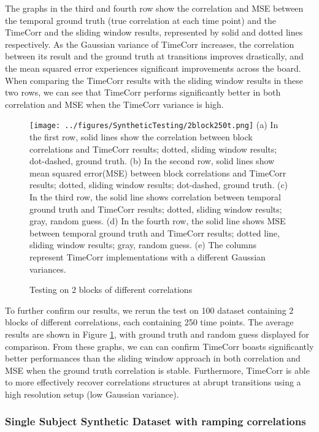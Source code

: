 \documentclass[11pt]{article}
\begin{document}
The graphs in the third and fourth row show the correlation and MSE between the temporal ground truth (true correlation at each time point) and the TimeCorr and the sliding window results, represented by solid and dotted lines respectively. As the Gaussian variance of TimeCorr increases, the correlation between its result and the ground truth at transitions improves drastically, and the mean squared error experiences significant improvements across the board. When comparing the TimeCorr results with the sliding window results in these two rows, we can see that TimeCorr performs significantly better in both correlation and MSE when the TimeCorr variance is high.

\begin{figure}[!htb]
\caption{Testing on 2 blocks of different correlations}
\texttt{[image: ../figures/SyntheticTesting/2block250t.png]}
\label{fig:2block250t}
(a) In the first row, solid lines show the correlation between block correlations and TimeCorr results; dotted, sliding window results; dot-dashed, ground truth. (b) In the second row, solid lines show mean squared error(MSE) between block correlations and TimeCorr results; dotted, sliding window results; dot-dashed, ground truth. (c) In the third row, the solid line shows correlation between temporal ground truth and TimeCorr results; dotted, sliding window results; gray, random guess. (d) In the fourth row, the solid line shows MSE between temporal ground truth and TimeCorr results; dotted line, sliding window results; gray, random guess. (e) The columns represent TimeCorr implementations with a different Gaussian variances.
\end{figure}

To further confirm our results, we rerun the test on 100 dataset containing 2 blocks of different correlations, each containing 250 time points. The average results are shown in Figure \ref{fig:2block250t}, with ground truth and random guess displayed for comparison. From these graphs, we can can confirm TimeCorr boasts significantly better performances than the sliding window approach in both correlation and MSE when the ground truth correlation is stable. Furthermore, TimeCorr is able to more effectively recover correlations structures at abrupt transitions using a high resolution setup (low Gaussian variance).

\subsubsection{Single Subject Synthetic Dataset with ramping correlations}
\end{document}
